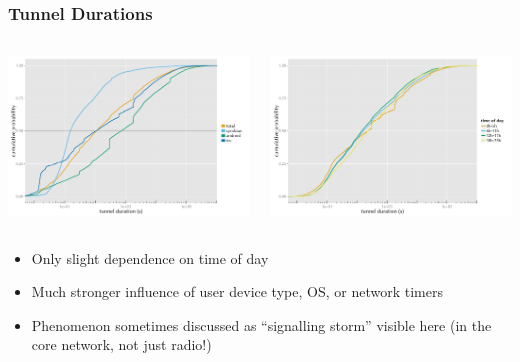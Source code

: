 \documentclass{beamer}
\begin{document}
\begin{frame}
	\frametitle{Tunnel Durations}

	\begin{columns}[T]
			\includegraphics[width=\columnwidth]{../../chapters/041-mobilenetsmeasuring/images/R-tunnel-duration-operating-system.pdf}

			\includegraphics[width=\columnwidth]{../../chapters/041-mobilenetsmeasuring/images/R-duration-timeofday-ecdf.pdf}
	\end{columns}

	\begin{itemize}
		\item Only slight dependence on time of day
		\item Much stronger influence of user device type, OS, or network timers
		\item Phenomenon sometimes discussed as ``signalling storm'' visible here (in the core network, not just radio!)
	\end{itemize}
\end{frame}
\end{document}
